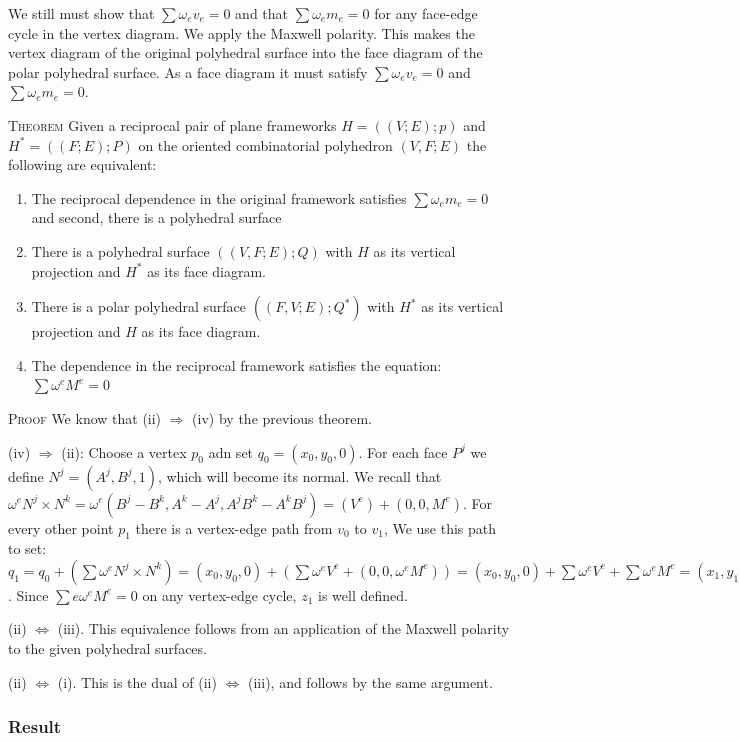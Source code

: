 \documentclass[11pt]{article}
\begin{document}
 We still must show that $\sum \omega_e v_e = 0$ and that $\sum \omega_em_e = 0$ for any face-edge cycle in the vertex diagram. We apply the Maxwell polarity. This makes the vertex diagram of the original polyhedral surface into the face diagram of the polar polyhedral surface. As a face diagram it must satisfy $\sum \omega_e v_e = 0$ and $\sum \omega_em_e = 0$.
 
 \textsc{Theorem} Given a reciprocal pair of plane frameworks $H=((V;E);p)$ and $H^* = ((F;E);P)$ on the oriented combinatorial polyhedron $(V,F;E)$ the following are equivalent: 
 \begin{enumerate} 
 	\item The reciprocal dependence in the original framework satisfies $\sum \omega_em_e = 0$ and second, there is a polyhedral surface 
 	\item There is a polyhedral surface $((V,F;E);Q)$ with $H$ as its vertical projection and $H^*$ as its face diagram.
	\item There is a polar polyhedral surface $((F,V;E);Q^*)$ with $H^*$ as its vertical projection and $H$ as its face diagram.
	\item The dependence in the reciprocal framework satisfies the equation: $\sum \omega^eM^e = 0$
\end{enumerate}
\textsc{Proof} We know that (ii) $\Rightarrow$ (iv) by the previous theorem. 

(iv) $\Rightarrow$ (ii): Choose a vertex $p_0$ adn set $q_0 = (x_0, y_0,0)$. For each face $P^j$ we define $N^j = (A^j,B^j,1)$, which will become its normal. We recall that $\omega^eN^j \times N^k = \omega^e(B^j-B^k,A^k-A^j, A^jB^k-A^kB^j) = (V^e) + (0,0,M^e)$. For every other point $p_1$ there is a vertex-edge path from $v_0$ to $v_1$, We use this path to set: $q_1 = q_0 + (\sum \omega^eN^j \times N^k) = (x_0,y_0,0) + (\sum \omega^eV^e + (0,0,\omega^eM^e)) = (x_0,y_0,0) + \sum \omega^eV^e + \sum \omega^eM^e = (x_1,y_1,0) + (0,0,\sum \omega_eM^e)$. Since $\sum{e}\omega^eM^e = 0$ on any vertex-edge cycle, $z_1$ is well defined.

(ii) $\Leftrightarrow$ (iii). This equivalence follows from an application of the Maxwell polarity to the given polyhedral surfaces.

(ii) $\Leftrightarrow$ (i). This is the dual of (ii) $\Leftrightarrow$ (iii), and follows by the same argument. 

 
 
\subsubsection{Result}
\end{document}
